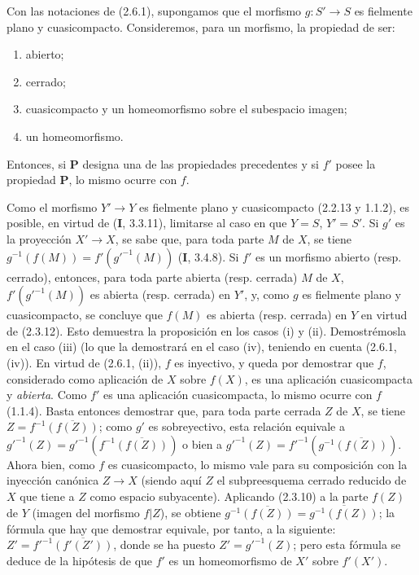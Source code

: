 \begin{proposition}[2.6.2]
\label{IV.2.6.2-fr}
Con las notaciones de \textup{(2.6.1)}, supongamos que el morfismo $g:S'\to S$ es
fielmente plano y cuasicompacto. Consideremos, para un morfismo, la propiedad
de ser:
\begin{enumerate}
\item[\textup{(i)}] abierto;
\item[\textup{(ii)}] cerrado;
\item[\textup{(iii)}] cuasicompacto y un homeomorfismo sobre el subespacio imagen;
\item[\textup{(iv)}] un homeomorfismo.
\end{enumerate}
Entonces, si $\boldsymbol{P}$ designa una de las propiedades precedentes y si $f'$ posee la
propiedad $\boldsymbol{P}$, lo mismo ocurre con $f$.
\end{proposition}

Como el morfismo $Y'\to Y$ es fielmente plano y cuasicompacto (2.2.13 y
1.1.2), es posible, en virtud de (\textbf I, 3.3.11), limitarse al caso en que $Y=S$,
$Y'=S'$. Si $g'$ es la proyección $X'\to X$, se sabe que, para toda parte $M$
de $X$, se tiene $g^{-1}(f(M))=f'(g'^{-1}(M))$ (\textbf{I}, 3.4.8). Si $f'$ es un morfismo abierto (resp. cerrado), entonces, para toda parte
abierta (resp. cerrada) $M$ de $X$, $f'(g'^{-1}(M))$ es abierta (resp.
cerrada) en $Y'$, y, como $g$ es fielmente plano y cuasicompacto, se concluye
que $f(M)$ es abierta (resp. cerrada) en $Y$ en virtud de (2.3.12). Esto
demuestra la proposición en los casos (i) y (ii). Demostrémosla en el caso
(iii) (lo que la demostrará en el caso (iv), teniendo en cuenta (2.6.1,
(iv)). En virtud de (2.6.1, (ii)), $f$ es inyectivo, y queda por demostrar que
$f$, considerado como aplicación de $X$ sobre $f(X)$, es una aplicación
cuasicompacta y \emph{abierta}. Como $f'$ es una aplicación cuasicompacta, lo mismo ocurre con $f$
(1.1.4). Basta entonces demostrar que, para toda parte cerrada $Z$ de $X$, se
tiene $Z=f^{-1}\overline{(f(Z))}$; como $g'$ es sobreyectivo, esta relación equivale a
$g'^{-1}(Z)=g'^{-1}(f^{-1}\overline{(f(Z))})$ o bien a
$g'^{-1}(Z)=f'^{-1}(g^{-1}\overline{(f(Z))})$. Ahora bien, como $f$ es cuasicompacto, lo mismo vale para su composición con la
inyección canónica $Z\to X$ (siendo aquí $Z$ el subpreesquema cerrado reducido
de $X$ que tiene a $Z$ como espacio subyacente). Aplicando (2.3.10) a la parte
$f(Z)$ de $Y$ (imagen del morfismo $f|Z$), se obtiene $g^{-1}\overline{(f(Z))}=\overline{g^{-1}(f(Z))}$;
la fórmula que hay que demostrar equivale, por tanto, a la siguiente:
$Z'=f'^{-1}\overline{(f'(Z'))}$, donde se ha puesto $Z'=g'^{-1}(Z)$; pero esta fórmula se deduce de la hipótesis
de que $f'$ es un homeomorfismo de $X'$ sobre $f'(X')$.
